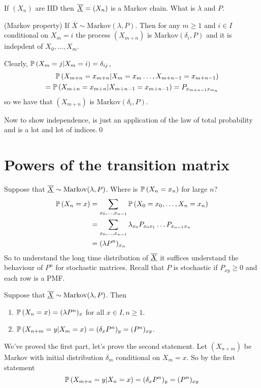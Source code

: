 \documentclass{article}
\begin{document}
\par
If $ (X_n) $ are IID then $ \underline{\overline{X}}=(X_n) $ is a Markov chain. What is $ \lambda $ and $ P $.
\begin{theorem}
	(Markov property) If $ \overline X \sim \text{Markov}(\lambda, P) $. Then for any $ m\ge 1 $ and $ i\in I $ conditional on $ X_m=i $ the process $ (X_{m+n}) $ is $ \text{Markov}(\delta_i,P) $ and it is indepdent of $ X_0,\dots, X_m $.
\end{theorem}
\pf Clearly, $ \mathbb{P}\left({X_m=j|X_m=i}\right)=\delta_{ij} $,
\begin{align*}
	\mathbb{P}\left({X_{m+n}=x_{m+n} | X_m=x_m\dots, X_{m+n-1}=x_{m+n-1}}\right) \\
	=\mathbb{P}\left({X_{m+n}=x_{m+n} | X_{m+n-1}=x_{m+n-1}}\right)=P_{x_{m+n-1}x_{m_n}}
\end{align*}
so we have that $ (X_{m+n}) $ is $ \text{Markov}(\delta_i, P) $.\par
Now to show independence, is just an application of the law of total probability and is a lot and lot of indices.\qed
\section{Powers of the transition matrix}
Suppose that $ \underline{\overline{X}}\sim\text{Markov}(\lambda, P) $. Where is $ \mathbb{P}\left({X_n=x_n}\right) $ for large $ n $?
\begin{align*}
	\mathbb{P}\left({X_n=x}\right)&=\sum_{x_0,\dots, x_{n-1}}\mathbb{P}\left({X_0=x_0,\dots, X_n=x_n}\right) \\ &= \sum_{x_0,\dots, x_{n-1}}\lambda_{x_0}P_{x_0x_1}\dots P_{x_{n-1}x_n} \\
		    &= (\lambda P^n)_{x_n}
\end{align*}
So to understand the long time distribution of $ \underline{\overline{X}} $ it suffices understand the behaviour of $ P^n $ for stochastic matrices. Recall that $ P $ is stochastic if $ P_{xy}\ge 0  $ and each row is a PMF.
\begin{theorem}
Suppose that $ \underline{\overline{X}}\sim\text{Markov}(\lambda, P) $. Then 
\begin{enumerate}
	\item $ \mathbb{P}\left({X_n=x}\right)=(\lambda P^n)_x $ for all $ x\in I, n \ge1 $.
	\item $ \mathbb{P}\left({X_{n+m}=y | X_m=x}\right)=(\delta_xP^n)_y=(P^n)_{xy} $.
\end{enumerate}
\end{theorem}
\pf We've proved the first part, let's prove the second statement. Let $ (X_{n+m}) $ be Markov with initial distribution $ \delta_m $ conditional on $ X_m=x $. So by the first statement
\[
	\mathbb{P}\left({X_{m+n}=y|X_n=x}\right)=(\delta_x P^n)_y=(P^n)_{xy}
\]
\end{document}
